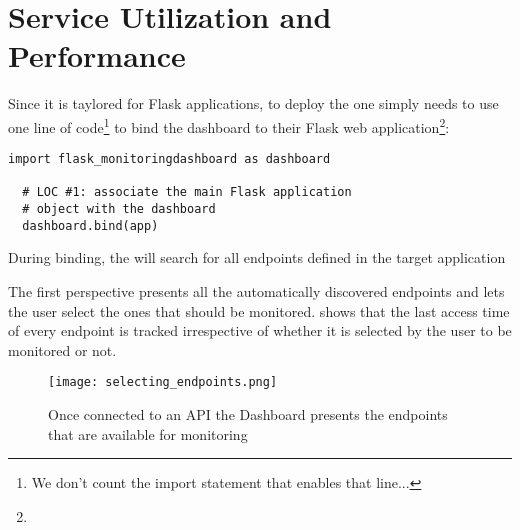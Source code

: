 

  \newpage
  \section{Service Utilization and Performance}

  Since it is taylored for Flask applications, to deploy the \tool one simply needs to use one line of code\footnote{We don't count the import statement that enables that line...} to bind the dashboard to their Flask web application\footnote{}:

  \begin{lstlisting}[style=custompython]
  import flask_monitoringdashboard as dashboard

  # LOC #1: associate the main Flask application 
  # object with the dashboard
  dashboard.bind(app) 

  \end{lstlisting}


  During binding, the \tool will search for all endpoints defined in the target application 
% 
% 

 The first perspective presents all the automatically discovered endpoints and lets the user select the ones that should be monitored. 
   shows that the last access time of every endpoint is tracked irrespective of whether it is selected by the user to be monitored or not. 


    \begin{figure}[h!]
      \centering
      \texttt{[image: selecting\_endpoints.png]}
      \caption{Once connected to an API the Dashboard presents the endpoints that are available for monitoring}
      \label{fig:sep}
    \end{figure}

